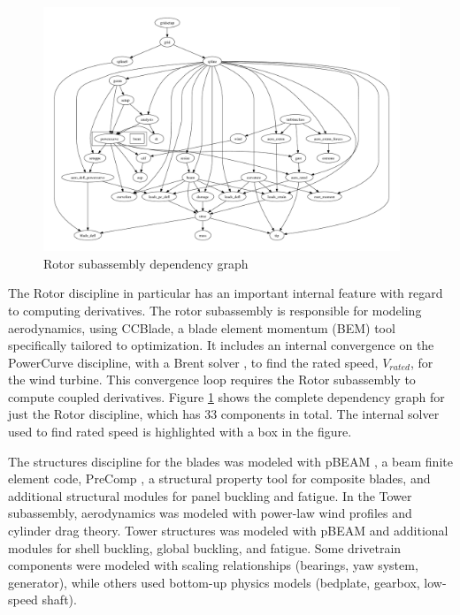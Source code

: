 \documentclass[]{aiaa-tc} %
\begin{document}
    \begin{figure}[!htbp]
        \centering
        \includegraphics[width=0.95\textwidth]{images/rotor_depgraph}
        \caption{Rotor subassembly dependency graph}
        \label{fig:wt_sub_depgraph}
    \end{figure}

    The Rotor discipline in particular has an important internal feature with regard to computing derivatives.
    The rotor subassembly is responsible for modeling aerodynamics, using CCBlade\cite{NING:BEM},
    a blade element momentum (BEM) tool specifically tailored to optimization. It includes
    an internal convergence on the PowerCurve discipline, with a Brent solver \cite{Brent1971}, to find the
    rated speed, $V_{rated}$, for the wind turbine. This convergence loop requires the Rotor
    subassembly to compute coupled derivatives. Figure \ref{fig:wt_sub_depgraph} shows the complete
    dependency graph for just the Rotor discipline, which has 33 components in total.  The internal solver used to 
    find rated speed is highlighted with a box in the figure.

    The structures discipline for the blades was modeled with pBEAM \cite{Ning2013b},
    a beam finite element code, PreComp \cite{Bir2005}, a structural property tool for
    composite blades, and additional structural modules for panel buckling and fatigue. In the Tower subassembly,
    aerodynamics was modeled with power-law wind profiles and cylinder drag theory.
    Tower structures was modeled with pBEAM and additional modules for shell buckling,
    global buckling, and fatigue.  Some drivetrain components were modeled with scaling
    relationships (bearings, yaw system, generator), while others used bottom-up physics
    models (bedplate, gearbox, low-speed shaft).
\end{document}

